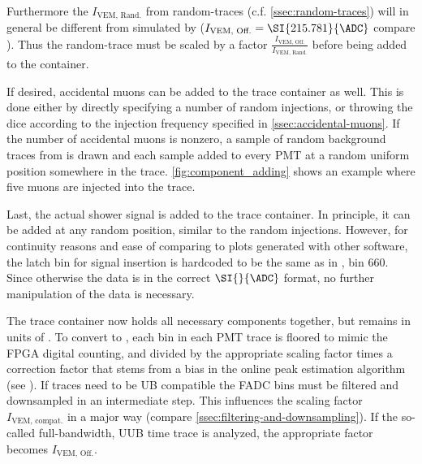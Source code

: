Furthermore the $I_\text{VEM, Rand.}$ from random-traces (c.f. \autoref{ssec:random-traces}) will in general be different from \Ipeak simulated by 
\Offline ($I_\text{VEM, Off.} = \SI{215.781}{\ADC}$ compare \cite{offlineSource}). Thus the random-trace must be scaled by a factor 
$\frac{I_\text{VEM, Off.}}{I_\text{VEM, Rand.}}$ before being added to the container. 

If desired, accidental muons can be added to the trace container as well. This is done either by directly specifying a number of random injections, or throwing the
dice according to the injection frequency specified in \autoref{ssec:accidental-muons}. If the number of accidental muons is nonzero, a sample of random background
traces from \cite{DavidBackgroundSim} is drawn and each sample added to every PMT at a random uniform position somewhere in the trace. 
\autoref{fig:component_adding} shows an example where five muons are injected into the trace.

Last, the actual shower signal is added to the trace container. In principle, it can be added at any random position, similar to the random injections. However, 
for continuity reasons and ease of comparing to plots generated with other software, the latch bin for signal insertion is hardcoded to be the same as in \Offline, 
bin $660$. Since otherwise the data is in the correct $\SI{}{\ADC}$ format, no further manipulation of the data is necessary.

The trace container now holds all necessary components together, but remains in units of \SI{}{\ADC}. To convert to \SI{}{\Peak}, each bin in each PMT trace is 
floored to mimic the FPGA digital counting, and divided by the appropriate scaling factor \Ipeak times a correction factor that stems from a bias in the online 
peak estimation algorithm (see \cite{bertou2006calibration}). If traces need to be UB compatible the FADC bins must be filtered and downsampled in an intermediate 
step. This influences the scaling factor $I_\text{VEM, compat.}$ in a major way (compare \autoref{ssec:filtering-and-downsampling}). If the so-called 
full-bandwidth, UUB time trace is analyzed, the appropriate factor becomes $I_\text{VEM, Off.}$.

